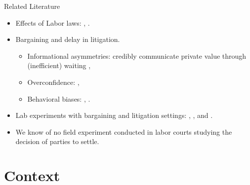 \documentclass[9pt]{beamer}
\begin{document}
\begin{frame}{Related Literature}
\begin{itemize}
    \item Effects of Labor laws: \citep{Botero_Regulation},  \citep{PonticelliAlencar_Bankrupcy}.
    \vspace{.1in}
    \item Bargaining and delay in litigation. 
        \begin{itemize}
        \item Informational asymmetries: credibly communicate private value through (inefficient) waiting \citep{Cramton_1991, Cramton_1992}, \citep{Cramton_1994a, Cramton_1994b}
        \item Overconfidence: \citep{Yildiz_CommonPrior}, \citep{Farber_DivergentExpectations}
        \item Behavioral biases: \citep{BabcockLoewensein_BargainingImpasse}, \citep{camerer_behavioral}.
    \end{itemize}
    \vspace{.1in}
    \item Lab experiments with bargaining and litigation settings: \citep{Ashenfelter_DisputeRates}, \citep{Pogarsky_DamageCaps}, and  \citep{Sullivan_Experimental}.
    \vspace{.1in}
    \item We know of no field experiment conducted in labor courts studying the decision of parties to settle.
\end{itemize}
\end{frame}


\section{Context}
\end{document}
